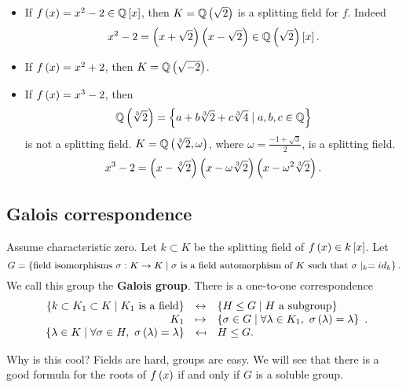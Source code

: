 \begin{example1}
\hfill
\begin{itemize}
\item If $ f\left( x \right) = x^2 - 2 \in \mathbb{Q}\left[ x \right] $, then $ K = \mathbb{Q}\left( \sqrt{2} \right) $ is a splitting field for $ f $. Indeed
$$ x^2 - 2 =\left( x + \sqrt{2} \right)\left( x - \sqrt{2} \right) \in \mathbb{Q}\left( \sqrt{2} \right)\left[ x \right]. $$
\item If $ f\left( x \right) = x^2 + 2 $, then $ K = \mathbb{Q}\left( \sqrt{-2} \right) $.
\item If $ f\left( x \right) = x^3 - 2 $, then
$$ \mathbb{Q}\left( \sqrt[3]{2} \right) = \left\{ a + b\sqrt[3]{2} + c\sqrt[3]{4} \mid a, b, c \in \mathbb{Q} \right\} $$
is not a splitting field. $ K = \mathbb{Q}\left( \sqrt[3]{2}, \omega \right) $, where $ \omega = \tfrac{-1 + \sqrt{3}}{2} $, is a splitting field.
$$ x^3 - 2 = \left( x - \sqrt[3]{2} \right)\left( x - \omega\sqrt[3]{2} \right)\left( x - \omega^2\sqrt[3]{2} \right). $$
\end{itemize}
\end{example1}

\subsection{Galois correspondence}

\begin{theorem}
\label{thm:galoiscorrespondence}
Assume characteristic zero. Let $ k \subset K $ be the splitting field of $ f\left( x \right) \in k\left[ x \right] $. Let
$$ G = \left\{ \text{field isomorphisms} \ \sigma : K \to K \mid \sigma \ \text{is a field automorphism of} \ K \ \text{such that} \ \sigma\mid_{k} = id_k \right\}. $$
We call this group the \textbf{Galois group}. There is a one-to-one correspondence
$$
\begin{array}{rcl}
\cb{k \subset K_1 \subset K \mid K_1 \ \text{is a field}} & \leftrightarrow & \cb{H \le G \mid H \ \text{a subgroup}} \\
K_1 & \mapsto & \cb{\sigma \in G \mid \forall \lambda \in K_1, \ \sigma\rb{\lambda} = \lambda} \\
\cb{\lambda \in K \mid \forall \sigma \in H, \ \sigma\rb{\lambda} = \lambda} & \mapsfrom & H \le G.
\end{array}.
$$
\end{theorem}

Why is this cool? Fields are hard, groups are easy. We will see that there is a good formula for the roots of $ f\left( x \right) $ if and only if $ G $ is a soluble group.


